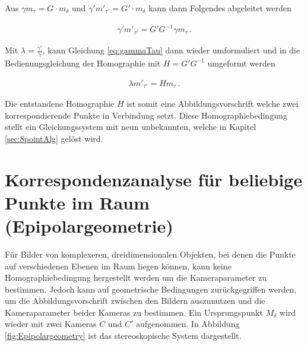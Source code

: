 Aus $\gamma m_\tau = G\cdot m_\delta$ und $\gamma' m'_{\tau'} = G'\cdot m_{\delta}$ kann dann Folgendes abgeleitet werden\cite{Elements}

\begin{gather}
	\gamma' m'_{\tau'} = G' G^{-1} \gamma m_\tau \, .\label{eq:gammaTau}
\end{gather}

Mit $\lambda= \frac{\gamma'}{\gamma}$, kann Gleichung \ref{eq:gammaTau} dann wieder umformuliert und in die Bedienungsgleichung der Homographie mit $H=G' G^{-1}$ umgeformt werden

\begin{gather}
	\lambda m'_{\tau'} = H m_\tau \, .\label{eq:H}
\end{gather} 


Die entstandene Homographie $H$ ist somit eine Abbildungsvorschrift welche zwei korrespondierende Punkte in Verbindung setzt. %
Diese Homographiebedingung stellt ein Gleichungssystem mit neun unbekannten, welche in Kapitel \ref{sec:8pointAlg} gelöst wird\cite{HZ}.



\section{Korrespondenzanalyse für beliebige Punkte im Raum (Epipolargeometrie)}
\label{sec:EpiolarContraints}

Für Bilder von komplexeren, dreidimensionalen Objekten, bei denen die Punkte auf verschiedenen Ebenen im Raum liegen können, kann keine Homographiebedingung hergestellt werden um die Kameraparameter zu bestimmen. Jedoch kann auf geometrische Bedingungen zurückgegriffen werden, um die Abbildungsvorschrift zwischen den Bildern auszunutzen und die Kameraparameter beider Kameras zu bestimmen. Ein Ursprungspunkt $M_\delta$ wird wieder mit zwei Kameras $C$ und $C'$ aufgenommen. In Abbildung \ref{fig:Epipolargeometry} ist das stereoskopische System dargestellt.
\pagebreak


